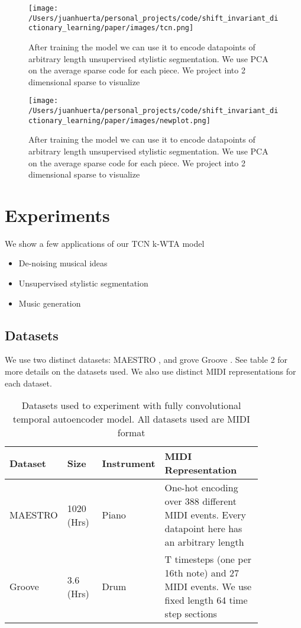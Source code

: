 \documentclass[11pt,a4paper]{article}
\begin{document}
\begin{figure}[ht]
  \texttt{[image: /Users/juanhuerta/personal\_projects/code/shift\_invariant\_dictionary\_learning/paper/images/tcn.png]}
  \caption{After training the model we can use it to encode datapoints of arbitrary length unsupervised stylistic segmentation. We use PCA on the average sparse code for each piece. We project into 2 dimensional sparse to visualize }
  \label{fig:boat1}
\end{figure}

\begin{figure*}[ht]
  \texttt{[image: /Users/juanhuerta/personal\_projects/code/shift\_invariant\_dictionary\_learning/paper/images/newplot.png]}
  \caption{After training the model we can use it to encode datapoints of arbitrary length unsupervised stylistic segmentation. We use PCA on the average sparse code for each piece. We project into 2 dimensional sparse to visualize }
  \label{fig:boat1}
\end{figure*}




\section{Experiments}
\label{ssec:experiments}

We show a few applications of our TCN k-WTA model 

\begin{itemize}
\item De-noising musical ideas 
\item Unsupervised stylistic segmentation
\item Music generation
\end{itemize}


\subsection{Datasets}
\label{ssec:experiments}

We use two distinct datasets: MAESTRO  \cite{hawthorne2018enabling}, and  grove Groove  \cite{groove2019} . See table 2 for more details on the datasets used. We also use distinct MIDI representations for each dataset. 

\begin{table*}[ht]
    \centering
    \begin{tabular}{p{0.15\linewidth} | p{0.15\linewidth} | p{0.1\linewidth}  | p{0.45\linewidth} }
      Dataset  & Size  & Instrument &  MIDI Representation\\ \hline
      MAESTRO  & 1020 (Hrs)   & Piano &  One-hot encoding over 388 different MIDI events. Every datapoint here has an arbitrary length \\
        \hline
        Groove & 3.6 (Hrs)  & Drum &  T timesteps (one per 16th note) and 27 MIDI events. We use fixed length 64 time step sections\\
    \end{tabular}
    \caption{Datasets used to experiment with fully convolutional temporal autoencoder model. All datasets used are MIDI format }
    \label{tab:my_label}
\end{table*}
\end{document}
